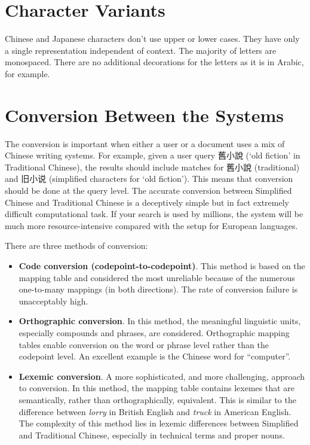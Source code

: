 \documentclass[11pt]{article}
\begin{document}
\section{Character Variants}
Chinese and Japanese characters don’t use upper or lower cases. They have only a single representation independent of context. The majority of letters are monospaced. There are no additional decorations for the letters as it is in Arabic, for example.

\section{Conversion Between the Systems}
The conversion is important when either a user or a document uses a mix of Chinese writing systems. For example, given a user query 舊小說 (‘old fiction’ in Traditional Chinese), the results should include matches for 舊小說 (traditional) and 旧小说 (simplified characters for ‘old fiction’). This means that conversion should be done at the query level. The accurate conversion between Simplified Chinese and Traditional Chinese is a deceptively simple but in fact extremely difficult computational task. If your search is used by millions, the system will be much more resource-intensive compared with the setup for European languages.

There are three methods of conversion:
\begin{itemize}
    \item \textbf{Code conversion (codepoint-to-codepoint)}. This method is based on the mapping table and considered the most unreliable because of the numerous one-to-many mappings (in both directions). The rate of conversion failure is unacceptably high.
    \item \textbf{Orthographic conversion}. In this method, the meaningful linguistic units, especially compounds and phrases, are considered. Orthographic mapping tables enable conversion on the word or phrase level rather than the codepoint level. An excellent example is the Chinese word for “computer”.
    \item \textbf{Lexemic conversion}. A more sophisticated, and more challenging, approach to conversion. In this method, the mapping table contains lexemes that are semantically, rather than orthographically, equivalent. This is similar to the difference between \textit{lorry} in British English and \textit{truck} in American English. The complexity of this method lies in lexemic differences between Simplified and Traditional Chinese, especially in technical terms and proper nouns.
\end{itemize}
\end{document}
